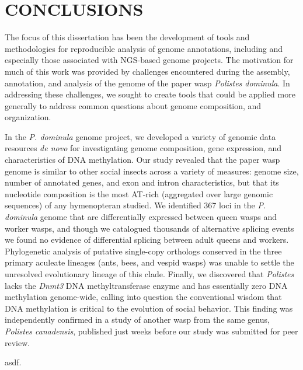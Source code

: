 \chapter{CONCLUSIONS}

The focus of this dissertation has been the development of tools and methodologies for reproducible analysis of genome annotations, including and especially those associated with NGS-based genome projects.
The motivation for much of this work was provided by challenges encountered during the assembly, annotation, and analysis of the genome of the paper wasp \textit{Polistes dominula}.
In addressing these challenges, we sought to create tools that could be applied more generally to address common questions about genome composition, and organization.

In the \textit{P. dominula} genome project, we developed a variety of genomic data resources \textit{de novo} for investigating genome composition, gene expression, and characteristics of DNA methylation.
Our study revealed that the paper wasp genome is similar to other social insects across a variety of measures: genome size, number of annotated genes, and exon and intron characteristics, but that its nucleotide composition is the most AT-rich (aggregated over large genomic sequences) of any hymenopteran studied.
We identified 367 loci in the \textit{P. dominula} genome that are differentially expressed between queen wasps and worker wasps, and though we catalogued thousands of alternative splicing events we found no evidence of differential splicing between adult queens and workers.
Phylogenetic analysis of putative single-copy orthologs conserved in the three primary aculeate lineages (ants, bees, and vespid wasps) was unable to settle the unresolved evolutionary lineage of this clade.
Finally, we discovered that \textit{Polistes} lacks the \textit{Dnmt3} DNA methyltransferase enzyme and has essentially zero DNA methylation genome-wide, calling into question the conventional wisdom that DNA methylation is critical to the evolution of social behavior.
This finding was independently confirmed in a study of another wasp from the same genus, \textit{Polistes canadensis}, published just weeks before our study was submitted for peer review.

asdf.
